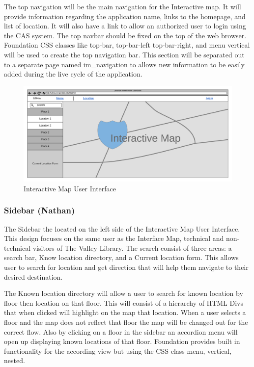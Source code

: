 \documentclass[letterpaper,10pt,titlepage, onecolumn, compsoc]{IEEEtran}
\begin{document}
The top navigation will be the main navigation for the Interactive map. It will provide information regarding the application name, links to the homepage, and list of location. It will also have a link to allow an authorized user to login using the CAS system. The top navbar should be fixed on the top of the web browser. Foundation CSS classes like top-bar, top-bar-left top-bar-right, and menu vertical will be used to create the top navigation bar. This section will be separated out to a separate page named im\_navigation to allows new information to be easily  added during the live cycle of the application. 

\begin{figure}[h!]
\centering
\includegraphics[scale=.45]{images/interactive-map.png}
\caption{Interactive Map User Interface}
\label{fig:method}
\end{figure}

\subsubsection{Sidebar (Nathan)}
The Sidebar the located on the left side of the Interactive Map User Interface. This design focuses on the same user as the Interface Map, technical and non-technical visitors of The Valley Library. The search consist of three areas: a search bar, Know location directory, and a Current location form. This allows user to search for location and get direction that will help them navigate to their desired destination. 

The Known location directory will allow a user to search for known location by floor then location on that floor. This will consist of a hierarchy of HTML Divs that when clicked will highlight on the map that location. When a user selects a floor and the map does not reflect that floor the map will be changed out for the correct flow. Also by clicking on a floor in the sidebar an accordion menu will open up displaying known locations of that floor. Foundation provides built in functionality for the according view but using the CSS class menu, vertical, nested.
\end{document}
